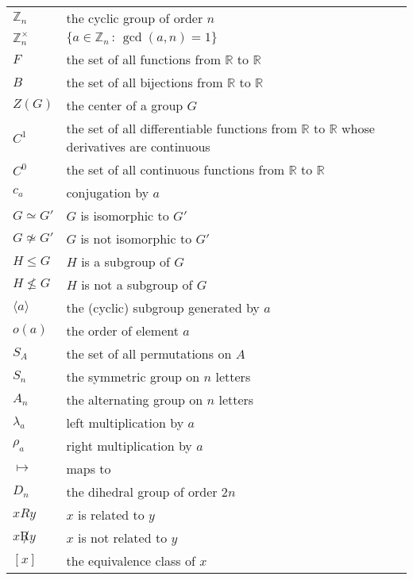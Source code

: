 \documentclass[10pt,]{book}
\theoremstyle{plain}
\theoremstyle{definition}
\theoremstyle{definition}
\theoremstyle{definition}
\theoremstyle{definition}
\numberwithin{equation}{section}
\def\Z{\mathbb{Z}}
\def\R{\mathbb{R}}
\begin{document}
\begin{longtable}[l]{lp{}r}
\(\Z_n\)&the cyclic group of order \(n\)&\pageref{notation-42}\\
\(\Z_n^{\times}\)&\(\{a\in \Z_n\,:\,\gcd(a,n)=1\}\)&\pageref{notation-43}\\
\(F\)&the set of all functions from \(\R\) to \(\R\)&\pageref{notation-44}\\
\(B\)&the set of all bijections from \(\R\) to \(\R\)&\pageref{notation-45}\\
\(Z(G)\)&the center of a group \(G\)&\pageref{notation-46}\\
\(C^1\)&the set of all differentiable functions from \(\R\) to \(\R\) whose derivatives are continuous&\pageref{notation-47}\\
\(C^0\)&the set of all continuous functions from \(\R\) to \(\R\)&\pageref{notation-48}\\
\(c_a\)&conjugation by \(a\)&\pageref{notation-49}\\
\(G\simeq G'\)&\(G\) is isomorphic to \(G'\)&\pageref{notation-50}\\
\(G\not \simeq G'\)&\(G\) is not isomorphic to \(G'\)&\pageref{notation-51}\\
\(H\leq G\)&\(H\) is a subgroup of \(G\)&\pageref{notation-52}\\
\(H\not \leq G\)&\(H\) is not a subgroup of \(G\)&\pageref{notation-53}\\
\(\langle a \rangle\)&the (cyclic) subgroup generated by \(a\)&\pageref{notation-54}\\
\(o(a)\)&the order of element \(a\)&\pageref{notation-55}\\
\(S_A\)&the set of all permutations on \(A\)&\pageref{notation-56}\\
\(S_n\)&the symmetric group on \(n\) letters&\pageref{notation-57}\\
\(A_n\)&the alternating group on \(n\) letters&\pageref{notation-58}\\
\(\lambda_a\)&left multiplication by \(a\)&\pageref{notation-59}\\
\(\rho_a\)&right multiplication by \(a\)&\pageref{notation-60}\\
\(\mapsto\)&maps to&\pageref{notation-61}\\
\(D_n\)&the dihedral group of order \(2n\)&\pageref{notation-62}\\
\(xRy\)&\(x\) is related to \(y\)&\pageref{notation-63}\\
\(x\not R y\)&\(x\) is not related to \(y\)&\pageref{notation-64}\\
\([x]\)&the equivalence class of \(x\)&\pageref{notation-65}\\

\end{longtable}
\end{document}
